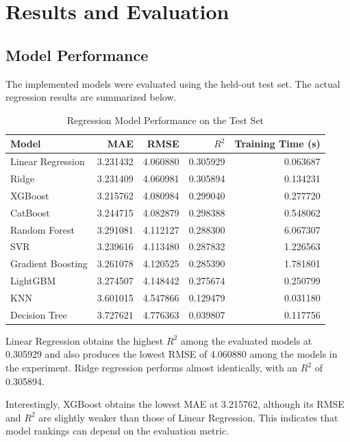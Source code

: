 \documentclass[conference]{IEEEtran}
\begin{document}
\section{Results and Evaluation}

\subsection{Model Performance}

The implemented models were evaluated using the held-out test set. The actual regression results are summarized below.

\begin{table}[H]
\centering
\caption{Regression Model Performance on the Test Set}
\begin{tabular}{lrrrr}
\toprule
\textbf{Model} & \textbf{MAE} & \textbf{RMSE} & \textbf{$R^2$} & \textbf{Training Time (s)}\\
\midrule
Linear Regression & 3.231432 & 4.060880 & 0.305929 & 0.063687\\
Ridge & 3.231409 & 4.060981 & 0.305894 & 0.134231\\
XGBoost & 3.215762 & 4.080984 & 0.299040 & 0.277720\\
CatBoost & 3.244715 & 4.082879 & 0.298388 & 0.548062\\
Random Forest & 3.291081 & 4.112127 & 0.288300 & 6.067307\\
SVR & 3.239616 & 4.113480 & 0.287832 & 1.226563\\
Gradient Boosting & 3.261078 & 4.120525 & 0.285390 & 1.781801\\
LightGBM & 3.274507 & 4.148442 & 0.275674 & 0.250799\\
KNN & 3.601015 & 4.547866 & 0.129479 & 0.031180\\
Decision Tree & 3.727621 & 4.776363 & 0.039807 & 0.117756\\
\bottomrule
\end{tabular}
\end{table}

Linear Regression obtains the highest $R^2$ among the evaluated models at 0.305929 and also produces the lowest RMSE of 4.060880 among the models in the experiment. Ridge regression performs almost identically, with an $R^2$ of 0.305894.

Interestingly, XGBoost obtains the lowest MAE at 3.215762, although its RMSE and $R^2$ are slightly weaker than those of Linear Regression. This indicates that model rankings can depend on the evaluation metric.
\end{document}
